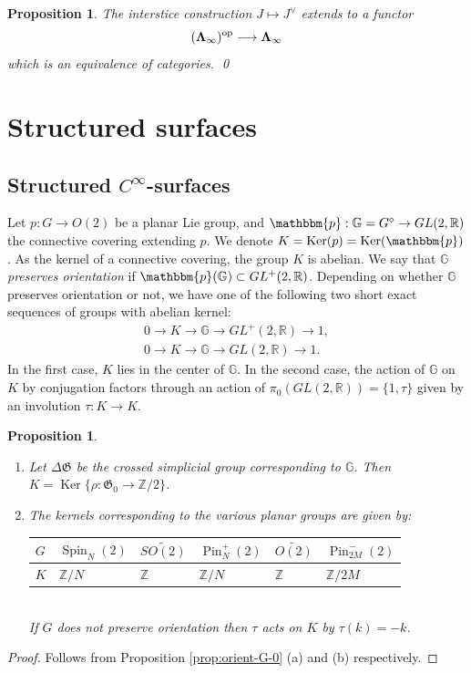 \documentclass[english,11pt,leqno]{article}
\def\GG{\mathbb{G}}
\def\RR{\mathbb{R}}
\def\ZZ{\mathbb{Z}}
\def\Gen{\mathfrak{G}}
\def\Ker{\operatorname{Ker}\nolimits}
\def\on{\operatorname}
\def\lra{\longrightarrow}
\def\op{{\operatorname{op}}}
\def\p{\mathbbm{p}}
\def\DG{ {\Delta \Gen}}
\newtheorem{prop}[thm]{Proposition}
\theoremstyle{definition}
\theoremstyle{remark}
\numberwithin{equation}{section}
\begin{document}
\begin{prop} The interstice construction $J \mapsto J^{\vee}$ extends to a functor
	\[
		({\bf \Lambda_{\infty}})^{\op} \lra {\bf \Lambda_{\infty}}
	\]
	which is an equivalence of categories. \qed
\end{prop}




 

\newpage
\section{Structured surfaces} 

\subsection{Structured $C^\infty$-surfaces}\label{subsec:c-infty}

Let $p:G\to O(2)$ be a planar Lie group, and $\p: \GG=G^\diamond \to GL(2, \RR)$
the connective covering extending $p$. We denote $K=\Ker(p)=\Ker(\p)$. As the kernel of a connective
covering, the group $K$ is abelian. We say that $\GG$ {\em preserves
orientation} if $\p(\GG)\subset GL^+(2,\RR)$. Depending on whether $\GG$ preserves
orientation or not, we have one of the following two short exact sequences of groups
with abelian kernel:
\begin{equation}\label{eq:group-K}
	\begin{gathered}
		0\to K\lra \GG \lra GL^+(2,\RR)\to 1,
		\\
		0\to K\lra \GG \lra GL(2,\RR)\to 1.
	\end{gathered}
\end{equation}
In the first case, $K$ lies in the center of $\GG$. In the second case, the action of $\GG$ on $K$
by conjugation factors through an action of $\pi_0(GL(2,\RR))= \{1, \tau\}$ given by an involution
$\tau:K\to K$. 

\begin{prop}\label{prop:group-K}
\begin{enumerate}
\item[(a)] Let $\DG$ be the crossed simplicial group corresponding to $\GG$. Then $K=\Ker\{\rho: \Gen_0\to \ZZ/2\}$.

\item[(b)] The kernels corresponding to the various planar groups are given by:\\
  \renewcommand{\arraystretch}{2}
  \begin{tabular}{ p{1cm} || p{2cm}| p{2cm}| p{2cm}|p{2cm}|p{2cm}}
	  $G$& $\on{Spin}_N(2)$& $\widetilde{SO(2)}$  & $\on{Pin}^+_N(2)$ & $\widetilde {O(2)}$& $\on{Pin}^-_{2M}(2)$
 \\
 \hline
 $K$ & $\ZZ/N$ & $\ZZ$ & $\ZZ/N$ & $\ZZ$ & $\ZZ/2M$
    \end{tabular}\\
 	If $G$ does not preserve orientation then $\tau$ acts on $K$ by $\tau(k)=-k$. 
\end{enumerate}
\end{prop}
\begin{proof} Follows from Proposition 
\ref{prop:orient-G-0} (a) and (b) respectively.
\end{proof}
\end{document}
